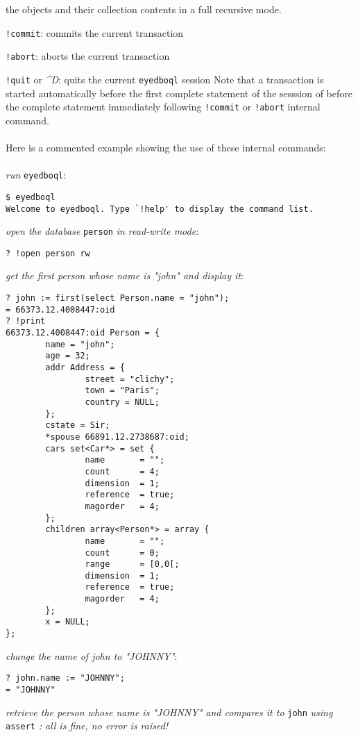 the objects and their collection contents in a full recursive mode.
\item \texttt{!commit}: commits the current transaction
\item \texttt{!abort}: aborts the current transaction
\item \texttt{!quit} or \emph{\^{}D}: quits the current \texttt{eyedboql} session
\ee
Note that a transaction is started automatically before the first
complete statement of the sesssion of before the complete statement
immediately following \texttt{!commit} or \texttt{!abort} internal command.
\\
\\
Here is a commented example showing the use of these internal commands:\\
\\
\emph{run} \texttt{eyedboql}:
\begin{verbatim}
$ eyedboql
Welcome to eyedboql. Type `!help' to display the command list.
\end{verbatim}
\emph{open the database} \texttt{person} \emph{in read-write mode}:
\begin{verbatim}
? !open person rw
\end{verbatim}
\emph{get the first person whose name is "john" and display it}:
\begin{verbatim}
? john := first(select Person.name = "john");
= 66373.12.4008447:oid
? !print
66373.12.4008447:oid Person = { 
        name = "john";
        age = 32;
        addr Address = { 
                street = "clichy";
                town = "Paris";
                country = NULL;
        };
        cstate = Sir;
        *spouse 66891.12.2738687:oid;
        cars set<Car*> = set { 
                name       = "";
                count      = 4;
                dimension  = 1;
                reference  = true;
                magorder   = 4;
        };
        children array<Person*> = array { 
                name       = "";
                count      = 0;
                range      = [0,0[;
                dimension  = 1;
                reference  = true;
                magorder   = 4;
        };
        x = NULL;
};
\end{verbatim}
\emph{change the name of john to "JOHNNY"}:
\begin{verbatim}
? john.name := "JOHNNY";
= "JOHNNY"
\end{verbatim}
\emph{retrieve the person whose name is "JOHNNY" and compares it to}
\texttt{john} \emph{using} \texttt{assert}
\emph{: all is fine, no error is raised!}
